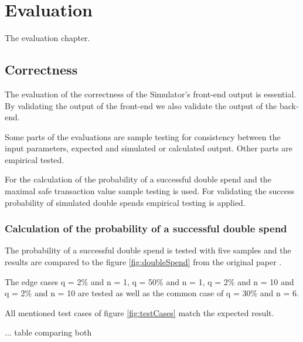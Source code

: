 \chapter{Evaluation}
\label{chapter:evaluation}

The evaluation chapter.

\section{Correctness}

The evaluation of the correctness of the Simulator's front-end output is essential. By validating the output of the front-end we also validate the output of the back-end.\linebreak

Some parts of the evaluations are sample testing for consistency between the input parameters, expected and simulated or calculated output. Other parts are empirical tested.\linebreak

For the calculation of the probability of a successful double spend and the maximal safe transaction value sample testing is used. For validating the success probability of simulated double spends empirical testing is applied.

\subsection{Calculation of the probability of a successful double spend}
\label{subsection:evalCalcDoubleSpending}

The probability of a successful double spend is tested with five samples and the results are compared to the figure \ref{fig:doubleSpend} from the original paper \cite{doublespending}.\linebreak

The edge cases q = 2\% and n = 1, q = 50\% and n = 1, q = 2\% and n = 10 and q = 2\% and n = 10 are tested as well as the common case of q = 30\% and n = 6.\linebreak

All mentioned test cases of figure \ref{fig:testCases} match the expected result.

... table comparing both

